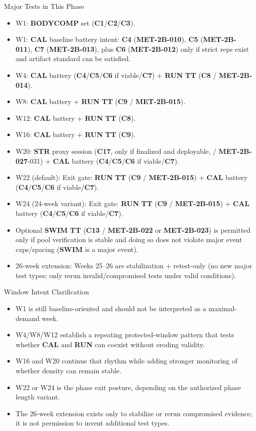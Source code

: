 \documentclass[10pt]{article}
\begin{document}
Major Tests in This Phase

\begin{itemize}
\item W1: \textbf{BODYCOMP} set (\textbf{C1}/\textbf{C2}/\textbf{C3}).
\item W1: \textbf{CAL} baseline battery intent: \textbf{C4} (\textbf{MET-2B-010}), \textbf{C5} (\textbf{MET-2B-011}), \textbf{C7} (\textbf{MET-2B-013}), plus \textbf{C6} (\textbf{MET-2B-012}) only if strict reps exist and artifact standard can be satisfied.
\item W4: \textbf{CAL} battery (\textbf{C4}/\textbf{C5}/\textbf{C6} if viable/\textbf{C7}) + \textbf{RUN} \textbf{TT} (\textbf{C8} / \textbf{MET-2B-014}).
\item W8: \textbf{CAL} battery + \textbf{RUN} \textbf{TT} (\textbf{C9} / \textbf{MET-2B-015}).
\item W12: \textbf{CAL} battery + \textbf{RUN} \textbf{TT} (\textbf{C8}).
\item W16: \textbf{CAL} battery + \textbf{RUN} \textbf{TT} (\textbf{C9}).
\item W20: \textbf{STR} proxy session (\textbf{C17}, only if finalized and deployable, / \textbf{MET-2B-027}-031) + \textbf{CAL} battery (\textbf{C4}/\textbf{C5}/\textbf{C6} if viable/\textbf{C7}).
\item W22 (default): Exit gate: \textbf{RUN} \textbf{TT} (\textbf{C9} / \textbf{MET-2B-015}) + \textbf{CAL} battery (\textbf{C4}/\textbf{C5}/\textbf{C6} if viable/\textbf{C7}).
\item W24 (24-week variant): Exit gate: \textbf{RUN} \textbf{TT} (\textbf{C9} / \textbf{MET-2B-015}) + \textbf{CAL} battery (\textbf{C4}/\textbf{C5}/\textbf{C6} if viable/\textbf{C7}).
\item Optional \textbf{SWIM} \textbf{TT} (\textbf{C13} / \textbf{MET-2B-022} or \textbf{MET-2B-023}) is permitted only if pool verification is stable and doing so does not violate major event caps/spacing (\textbf{SWIM} is a major event).
\item 26-week extension: Weeks 25–26 are stabilization + retest-only (no new major test types; only rerun invalid/compromised tests under valid conditions).
\end{itemize}

Window Intent Clarification

\begin{itemize}
\item W1 is still baseline-oriented and should not be interpreted as a maximal-demand week.
\item W4/W8/W12 establish a repeating protected-window pattern that tests whether \textbf{CAL} and \textbf{RUN} can coexist without eroding validity.
\item W16 and W20 continue that rhythm while adding stronger monitoring of whether density can remain stable.
\item W22 or W24 is the phase exit posture, depending on the authorized phase length variant.
\item The 26-week extension exists only to stabilize or rerun compromised evidence; it is not permission to invent additional test types.
\end{itemize}
\end{document}
